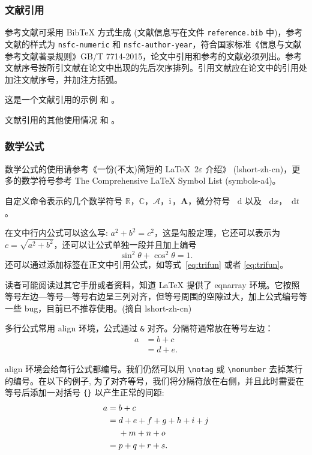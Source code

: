 \documentclass[GP]{nsfc}
\newcommand*{\dif}{\mathop{}\!\mathrm{d}}
\newcommand{\CC}{\ensuremath{\mathbb{C}}}
\newcommand{\RR}{\ensuremath{\mathbb{R}}}
\newcommand{\A}{\mathcal{A}}
\newcommand{\bA}{\boldsymbol{A}}
\newcommand{\ii}{\mathrm{i}\mkern1mu}
\newcommand{\dx}[1][x]{\mathop{}\!\mathrm{d}#1}
\begin{document}
\subsubsection{文献引用}

参考文献可采用 BibTeX 方式生成 (文献信息写在文件 \verb|reference.bib| 中)，参考文献的样式为 \verb|nsfc-numeric| 和 \verb|nsfc-author-year|，符合国家标准《信息与文献参考文献著录规则》GB/T 7714-2015，论文中引用和参考的文献必须列出。参考文献序号按所引文献在论文中出现的先后次序排列。引用文献应在论文中的引用处加注文献序号，并加注方括弧。

这是一个文献引用的示例 \cite{Tadmor2012} 和 \cite{LiLiu1997,Adams2003,TreWei2014}。

文献引用的其他使用情况 \cite[定理~1.1]{LiLiu1997} 和 \cite{Shen1994,LiuEtAl2024}。

\subsubsection{数学公式}

数学公式的使用请参考《一份(不太)简短的 \LaTeX~2$\varepsilon$ 介绍》 (lshort-zh-cn)，更多的数学符号参考 The Comprehensive LaTeX Symbol List (symbols-a4)。

自定义命令表示的几个数学符号 $\RR$，$\CC$，$\A$，$\ii$，$\bA$，微分符号 $\dif$ 以及 $\dx$，$\dx[t]$。

在文中行内公式可以这么写: $a^2+b^2=c^2$，这是勾股定理，它还可以表示为 $c=\sqrt{a^2+b^2}$，还可以让公式单独一段并且加上编号
\begin{equation}\label{eq:trifun}
\sin^2{\theta}+\cos^2{\theta}=1.
\end{equation}
还可以通过添加标签在正文中引用公式，如等式~\eqref{eq:trifun} 或者 \ref{eq:trifun}。

读者可能阅读过其它手册或者资料，知道 LaTeX 提供了 eqnarray 环境。它按照等号左边—等号—等号右边呈三列对齐，但等号周围的空隙过大，加上公式编号等一些 bug，目前已不推荐使用。(摘自 lshort-zh-cn)

多行公式常用 align 环境，公式通过 \verb|&| 对齐。分隔符通常放在等号左边：
\begin{align}
a & = b + c \\
& = d + e.
\end{align}

align 环境会给每行公式都编号。我们仍然可以用 \verb|\notag| 或 \verb|\nonumber| 去掉某行的编号。在以下的例子,
为了对齐等号，我们将分隔符放在右侧，并且此时需要在等号后添加一对括号 \verb|{}| 以产生正常的间距:
\begin{align}
a ={} & b + c \\
={} & d + e + f + g + h + i + j \notag \\
& + m + n + o \\
={} & p + q + r + s.
\end{align}
\end{document}
